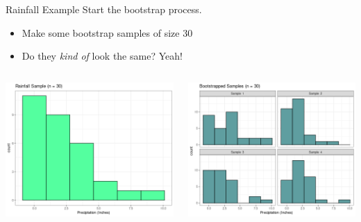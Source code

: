 \documentclass{beamer}
\begin{document}
\begin{frame}{Rainfall Example}
Start the bootstrap process.
\begin{itemize}
    \item Make some bootstrap samples of size 30
    \item Do they \textit{kind of} look the same? Yeah!
\end{itemize}
\begin{columns}

  \begin{column}{0.45\textwidth}
\begin{center}
\includegraphics[scale=0.32]{grin_rain_samp.png}
\end{center}
  \end{column}
  \begin{column}{0.45\textwidth}
\begin{center}
\includegraphics[scale=0.32]{grin_rain_boot.png}
\end{center}
  \end{column}

\end{columns}
\end{frame}
\end{document}
